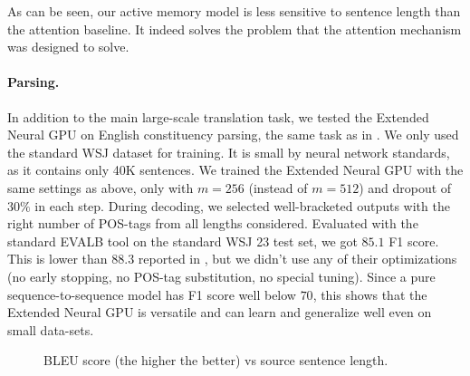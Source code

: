\documentclass{article}
\begin{document}
As can be seen, our active memory model is less sensitive to sentence
length than the attention baseline. It indeed solves
the problem that the attention mechanism was  designed to solve.

\paragraph{Parsing.}
In addition to the main large-scale translation task, we tested
the Extended Neural GPU on English constituency parsing, the same
task as in \cite{KVparse15}. We only used the standard WSJ dataset
for training. It is small by neural network standards, as it contains
only 40K sentences. We trained the Extended Neural GPU with the same
settings as above, only with $m=256$ (instead of $m=512$) and
dropout of $30\%$ in each step. During decoding, we selected
well-bracketed outputs with the right number of POS-tags from
all lengths considered. Evaluated with the standard EVALB tool
on the standard WSJ 23 test set, we got $85.1$ F1 score. This is
lower than $88.3$ reported in \cite{KVparse15}, but we didn't use
any of their optimizations (no early stopping, no POS-tag substitution,
no special tuning). Since a pure sequence-to-sequence model has F1
score well below $70$, this shows that the Extended Neural GPU is
versatile and can learn and generalize well even on small data-sets.


\begin{figure}\begin{center}
\end{center}

\caption{BLEU score (the higher the better) vs source sentence length.}
\label{fig:len}
\end{figure}
\end{document}
